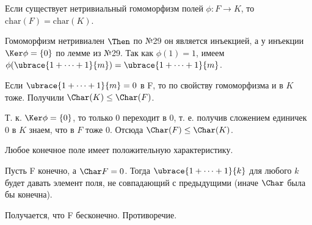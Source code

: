 \begin{problem}
Если существует нетривиальный гомоморфизм полей $\phi: F \to K$, то $\mathrm{char}(F) = \mathrm{char}(K)$.
\end{problem}
\begin{solution}
Гомоморфизм нетривиален $\Then$ по №29 он является инъекцией, а у инъекции \(\Ker \phi = \{0\}\) по лемме из №29.
Так как \(\phi(1) = 1\), имеем \(\phi(\ubrace{1+\dots+1}{m}) = \ubrace{1+\dots+1}{m}\). 

Если \(\ubrace{1+\dots+1}{m} = 0\) в F, то по свойству гомоморфизма и в $K$ тоже. Получили $\Char(K) \le \Char(F)$.

Т. к. \(\Ker \phi = \{0\}\), то только 0 переходит в 0, т. е. получив сложением единичек $0$ в $K$ знаем, что в $F$ тоже $0$. Отсюда $\Char(F) \le \Char(K) $.

\end{solution}

\begin{problem}[28(6.5)]
Любое конечное поле имеет положительную характеристику.
\end{problem}
\begin{solution}
Пусть F конечно, а \(\Char F = 0\). Тогда \(\ubrace{1+\dots+1}{k}\) для любого $k$ будет давать элемент поля, не совпадающий с предыдущими (иначе \(\Char\) была бы конечна).

Получается, что F бесконечно. Противоречие.
\end{solution}

